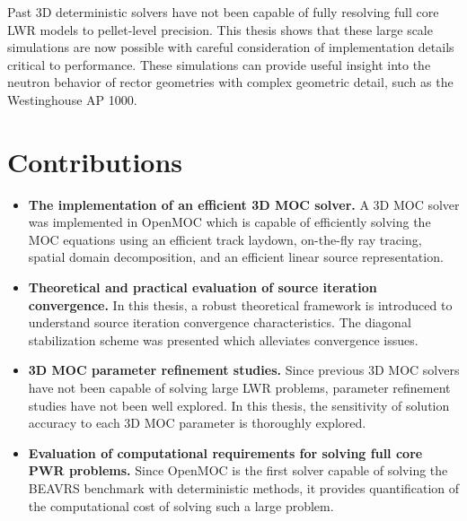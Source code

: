 Past 3D deterministic solvers have not been capable of fully resolving full core \ac{LWR} models to pellet-level precision. This thesis shows that these large scale simulations are now possible with careful consideration of implementation details critical to performance. These simulations can provide useful insight into the neutron behavior of rector geometries with complex geometric detail, such as the Westinghouse AP 1000\texttrademark.

\section{Contributions}
\label{sec:contributions}

\begin{emphbox}
\begin{itemize}
	
	\item \textbf{The implementation of an efficient 3D \ac{MOC} solver.} A 3D \ac{MOC} solver was implemented in OpenMOC which is capable of efficiently solving the \ac{MOC} equations using an efficient track laydown, on-the-fly ray tracing, spatial domain decomposition, and an efficient linear source representation.
	
	\item \textbf{Theoretical and practical evaluation of source iteration convergence.} In this thesis, a robust theoretical framework is introduced to understand source iteration convergence characteristics. The diagonal stabilization scheme was presented which alleviates convergence issues.
	
	\item \textbf{3D \ac{MOC} parameter refinement studies.} Since previous 3D \ac{MOC} solvers have not been capable of solving large \ac{LWR} problems, parameter refinement studies have not been well explored. In this thesis, the sensitivity of solution accuracy to each 3D \ac{MOC} parameter is thoroughly explored.
	
	\item \textbf{Evaluation of computational requirements for solving full core \ac{PWR} problems.} Since OpenMOC is the first solver capable of solving the BEAVRS benchmark with deterministic methods, it provides quantification of the computational cost of solving such a large problem.
	
\end{itemize}
\end{emphbox}


\newpage
